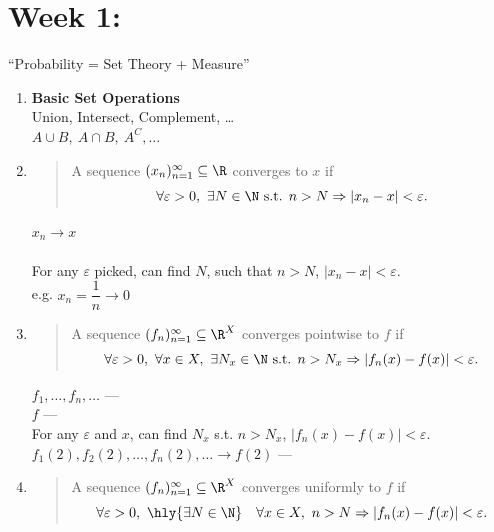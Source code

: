 
\section{Week 1: }


``Probability = Set Theory + Measure''

\begin{enumerate}
    \item \textbf{Basic Set Operations}
    \\ Union, Intersect, Complement, \dots
    \\ $A\cup B,\ A\cap B,\ A^C, \dots$

    \item {}
    \begin{quote}
        A sequence $(x_n)_{n=1}^\infty \subseteq \R$ converges to $x$ if
        \[\forall \varepsilon>0,\ \exists N \in \N \text{ s.t. } n>N \Rightarrow \left\lvert x_n-x\right\rvert < \varepsilon.\]
    \end{quote}
    $x_n \to x$ 
    \\ 
    \\ For any $\varepsilon$ picked, can find $N$, such that $n>N$, $\left\lvert x_n-x\right\rvert < \varepsilon$.
    \\ e.g. $x_n = \dfrac{1}{n} \to 0$

    \item {}
    \begin{quote}
        A sequence $(f_n)_{n=1}^\infty \subseteq \R^X$ converges pointwise to $f$  if
        \[\forall \varepsilon>0,\ \forall x \in X,\ \exists N_x \in \N \text{ s.t. } n>N_x \Rightarrow \left\lvert f_n(x)-f(x)\right\rvert < \varepsilon.\]
    \end{quote}
    $f_1,\dots,f_n,\dots$ --- 
    \\ $f$ --- 
    \\ For any $\varepsilon$ and $x$, can find $N_x$ s.t. $n>N_x$, $\left\lvert f_n(x)-f(x)\right\rvert < \varepsilon$.
    \\ $f_1(2), f_2(2), \dots, f_n(2), \dots \to f(2)$ --- 

    \item {}
    \begin{quote}
        A sequence $(f_n)_{n=1}^\infty \subseteq \R^X$ converges uniformly to $f$ if
        \[\forall \varepsilon>0,\ \hly{\exists N \in \N} \quad \forall x \in X,\ n>N \Rightarrow \left\lvert f_n(x)-f(x)\right\rvert < \varepsilon.\]
    \end{quote}
\end{enumerate}

